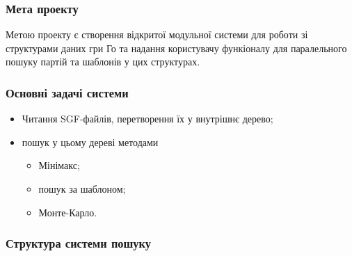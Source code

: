 \documentclass{beamer}
\begin{document}
\begin{frame}
    \frametitle{Мета проекту}
    Метою проекту є створення відкритої модульної системи для роботи зі структурами даних гри Го та надання користувачу функіоналу для паралельного пошуку партій та шаблонів у цих структурах.
\end{frame}

\begin{frame}
    \frametitle{Основні задачі системи}
    \begin{itemize}
        \item Читання SGF-файлів, перетворення їх у внутрішнє дерево;
        \item пошук у цьому дереві методами
        \begin{itemize}
            \item Мінімакс;
            \item пошук за шаблоном;
            \item Монте-Карло.
        \end{itemize}
    \end{itemize}
\end{frame}

\begin{frame}
    \frametitle{Структура системи пошуку}

\end{frame}
\end{document}
